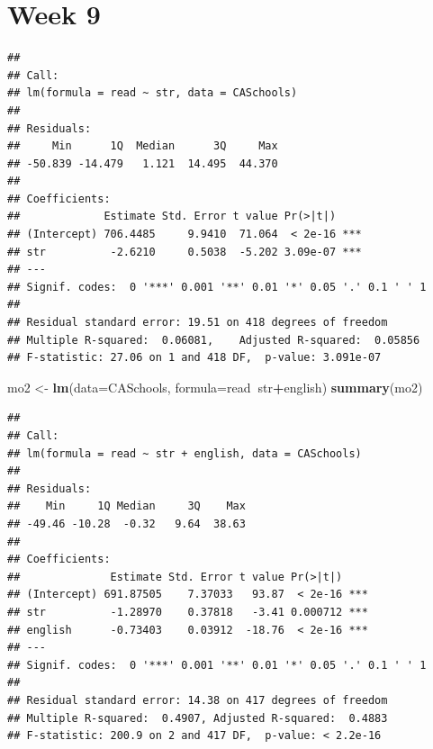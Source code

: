 \documentclass[
]{book}
\newenvironment{Shaded}{\begin{snugshade}}{\end{snugshade}}
\newcommand{\DataTypeTok}[1]{\textcolor[rgb]{0.13,0.29,0.53}{#1}}
\newcommand{\KeywordTok}[1]{\textcolor[rgb]{0.13,0.29,0.53}{\textbf{#1}}}
\newcommand{\NormalTok}[1]{#1}
\newcommand{\OperatorTok}[1]{\textcolor[rgb]{0.81,0.36,0.00}{\textbf{#1}}}
\newcommand{\StringTok}[1]{\textcolor[rgb]{0.31,0.60,0.02}{#1}}
\begin{document}
\hypertarget{week-9}{%
\section{Week 9}\label{week-9}}

\begin{Shaded}
\end{Shaded}

\begin{verbatim}
## 
## Call:
## lm(formula = read ~ str, data = CASchools)
## 
## Residuals:
##     Min      1Q  Median      3Q     Max 
## -50.839 -14.479   1.121  14.495  44.370 
## 
## Coefficients:
##             Estimate Std. Error t value Pr(>|t|)    
## (Intercept) 706.4485     9.9410  71.064  < 2e-16 ***
## str          -2.6210     0.5038  -5.202 3.09e-07 ***
## ---
## Signif. codes:  0 '***' 0.001 '**' 0.01 '*' 0.05 '.' 0.1 ' ' 1
## 
## Residual standard error: 19.51 on 418 degrees of freedom
## Multiple R-squared:  0.06081,    Adjusted R-squared:  0.05856 
## F-statistic: 27.06 on 1 and 418 DF,  p-value: 3.091e-07
\end{verbatim}

\begin{Shaded}
\begin{Highlighting}[]
\NormalTok{mo2 <-}\StringTok{ }\KeywordTok{lm}\NormalTok{(}\DataTypeTok{data=}\NormalTok{CASchools, }\DataTypeTok{formula=}\NormalTok{read}\OperatorTok{~}\NormalTok{str}\OperatorTok{+}\NormalTok{english)}
\KeywordTok{summary}\NormalTok{(mo2)}
\end{Highlighting}
\end{Shaded}

\begin{verbatim}
## 
## Call:
## lm(formula = read ~ str + english, data = CASchools)
## 
## Residuals:
##    Min     1Q Median     3Q    Max 
## -49.46 -10.28  -0.32   9.64  38.63 
## 
## Coefficients:
##              Estimate Std. Error t value Pr(>|t|)    
## (Intercept) 691.87505    7.37033   93.87  < 2e-16 ***
## str          -1.28970    0.37818   -3.41 0.000712 ***
## english      -0.73403    0.03912  -18.76  < 2e-16 ***
## ---
## Signif. codes:  0 '***' 0.001 '**' 0.01 '*' 0.05 '.' 0.1 ' ' 1
## 
## Residual standard error: 14.38 on 417 degrees of freedom
## Multiple R-squared:  0.4907, Adjusted R-squared:  0.4883 
## F-statistic: 200.9 on 2 and 417 DF,  p-value: < 2.2e-16
\end{verbatim}
\end{document}
